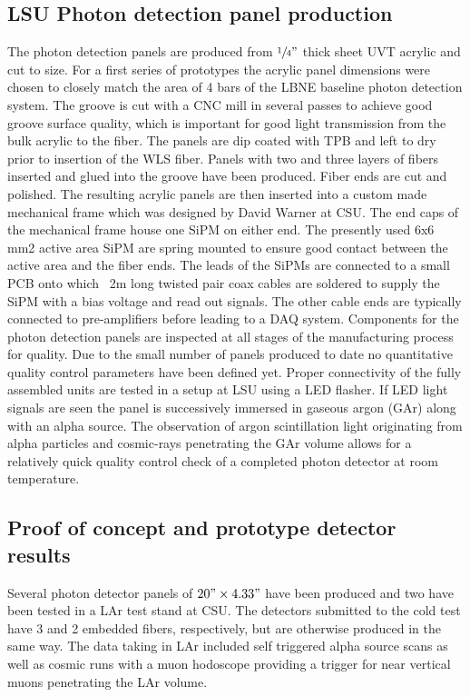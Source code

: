 \subsection{LSU Photon detection panel production}
The photon detection panels are produced from $\sfrac{1}{4}"$ thick
sheet UVT acrylic and cut to size. For a first series of prototypes
the acrylic panel dimensions were chosen to closely match the area of
4 bars of the LBNE baseline photon detection system.  The groove is
cut with a CNC mill in several passes to achieve good groove surface
quality, which is important for good light transmission from the bulk
acrylic to the fiber. The panels are dip coated with TPB and left to
dry prior to insertion of the WLS fiber. Panels with two and three
layers of fibers inserted and glued into the groove have been
produced. Fiber ends are cut and polished.  The resulting acrylic
panels are then inserted into a custom made mechanical frame which was
designed by David Warner at CSU. The end caps of the mechanical frame
house one SiPM on either end. The presently used 6x6 mm2 active area
SiPM are spring mounted to ensure good contact between the active area
and the fiber ends.  The leads of the SiPMs are connected to a small
PCB onto which ~2m long twisted pair coax cables are soldered to
supply the SiPM with a bias voltage and read out signals. The other
cable ends are typically connected to pre-amplifiers before leading to
a DAQ system.  Components for the photon detection panels are
inspected at all stages of the manufacturing process for quality. Due
to the small number of panels produced to date no quantitative quality
control parameters have been defined yet.  Proper connectivity of the
fully assembled units are tested in a setup at LSU using a LED
flasher. If LED light signals are seen the panel is successively
immersed in gaseous argon (GAr) along with an alpha source. The
observation of argon scintillation light originating from alpha
particles and cosmic-rays penetrating the GAr volume allows for a
relatively quick quality control check of a completed photon detector
at room temperature.

\subsection{Proof of concept and prototype detector results}
Several photon detector panels of $20" \times 4.33"$ have been
produced and two have been tested in a LAr test stand at CSU. The
detectors submitted to the cold test have 3 and 2 embedded fibers,
respectively, but are otherwise produced in the same way. The data
taking in LAr included self triggered alpha source scans as well as
cosmic runs with a muon hodoscope providing a trigger for near
vertical muons penetrating the LAr volume.
